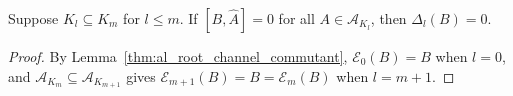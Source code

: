 \begin{lemma}
    \label{thm:al_channel_shell_commutant}
    \leanok
    Suppose $K_l\subseteq K_m$ for $l\le m$. If $[B,\widehat A]=0$ for all
    $A\in\mathcal A_{K_l}$, then $\Delta_l(B)=0$.
\end{lemma}
\begin{proof}
    \leanok
    By Lemma~\ref{thm:al_root_channel_commutant}, $\mathcal E_0(B)=B$ when
    $l=0$, and $\mathcal A_{K_m}\subseteq\mathcal A_{K_{m+1}}$ gives
    $\mathcal E_{m+1}(B)=B=\mathcal E_m(B)$ when $l=m+1$.
\end{proof}

